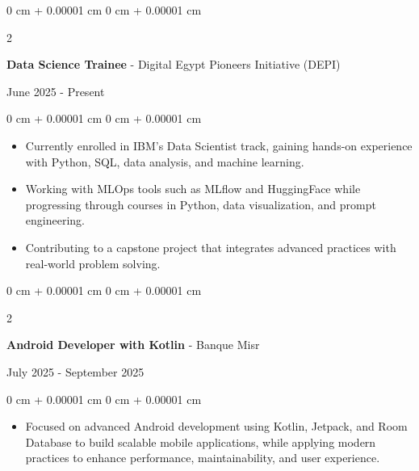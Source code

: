 \documentclass[10pt, letterpaper]{article}
\newenvironment{highlights}{
\begin{itemize}[
topsep=0.10 cm,
parsep=0.10 cm,
partopsep=0pt,
itemsep=0pt,
leftmargin=0 cm + 10pt
]
}{
\end{itemize}
} %
\newenvironment{onecolentry}{
\begin{adjustwidth}{
0 cm + 0.00001 cm
}{
0 cm + 0.00001 cm
}
}{
\end{adjustwidth}
} %
\newenvironment{twocolentry}[2][]{
\onecolentry
\def\secondColumn{#2}
\setcolumnwidth{\fill, 4.5 cm}
\begin{paracol}{2}
}{
\switchcolumn \raggedleft \secondColumn
\end{paracol}
\endonecolentry
} %
\begin{document}
\vspace{0.2 cm}
\begin{twocolentry}{
June 2025 - Present
}
\textbf{\large Data Science Trainee} - Digital Egypt Pioneers Initiative (DEPI)
\end{twocolentry}
\vspace{0.1 cm}
\begin{onecolentry}
\begin{highlights}

\item
Currently enrolled in IBM’s Data Scientist track, gaining hands-on experience with Python, SQL, data analysis, and machine learning.

\item
Working with MLOps tools such as MLflow and HuggingFace while progressing through courses in Python, data visualization, and prompt engineering.

\item
Contributing to a capstone project that integrates advanced practices with real-world problem solving.

\end{highlights}
\end{onecolentry}


\vspace{0.2 cm}
\begin{twocolentry}{
July 2025 - September 2025
}
\textbf{\large Android Developer with Kotlin} - Banque Misr
\end{twocolentry}
\vspace{0.1 cm}
\begin{onecolentry}
\begin{highlights}

\item
Focused on advanced Android development using Kotlin, Jetpack, and Room Database to build scalable mobile applications, while applying modern practices to enhance performance, maintainability, and user experience.

\end{highlights}
\end{onecolentry}
\end{document}
